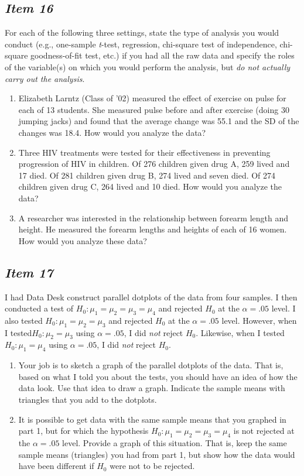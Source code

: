 \documentclass[twoside,openany]{tufte-book}
\begin{document}
\newpage


\subsection{\textbf{\textit{Item 16}}}
For each of the following three settings, state the type of analysis you would conduct (e.g., one-sample \textit{t}-test, regression, chi-square test of independence, chi-square goodness-of-fit test, etc.) if you had all the raw data and specify the roles of the variable(s) on which you would perform the analysis, but \textit{do not actually carry out the analysis}.
\begin{enumerate}[leftmargin=1cm, itemsep=.2em]
\item Elizabeth Larntz (Class of '02) measured the effect of exercise on pulse for each of 13 students.  She measured pulse before and after exercise (doing 30 jumping jacks) and found that the average change was 55.1 and the SD of the changes was 18.4.  How would you analyze the data?
\item Three HIV treatments were tested for their effectiveness in preventing progression of HIV in children.  Of 276 children given drug A, 259 lived and 17 died. Of 281 children given drug B, 274 lived and seven died.  Of 274 children given drug C, 264 lived and 10 died.  How would you analyze the data?
\item A researcher was interested in the relationship between forearm length and height.  He measured the forearm lengths and heights of each of 16 women.  How would you analyze these data?
\end{enumerate}

\subsection{\textbf{\textit{Item 17}}}
I had Data Desk construct parallel dotplots of the data from four samples.  I then conducted a test of $H_0: \mu_1=\mu_2=\mu_3=\mu_4$ and rejected $H_0$ at the $\alpha = .05$ level.  I also tested $H_0: \mu_1=\mu_2=\mu_3$ and rejected $H_0$ at the $\alpha = .05$ level.  However, when I tested$H_0: \mu_2=\mu_3$ using $\alpha = .05$, I did \textit{not} reject $H_0$.  Likewise, when I tested $H_0: \mu_1=\mu_4$ using $\alpha = .05$, I did \textit{not} reject $H_0$.
\begin{enumerate}[leftmargin=1cm, itemsep=.2em]
\item Your job is to sketch a graph of the parallel dotplots of the data. That is, based on what I told you about the tests, you should have an idea of how the data look. Use that idea to draw a graph.  Indicate the sample means with triangles that you add to the dotplots.
\item It is possible to get data with the same sample means that you graphed in part 1, but for which the hypothesis $H_0: \mu_1=\mu_2=\mu_3=\mu_4$ is not rejected at the $\alpha = .05$ level.  Provide a graph of this situation.  That is, keep the same sample means (triangles) you had from part 1, but show how the data would have been different if $H_0$ were not to be rejected.
\end{enumerate}
\end{document}
